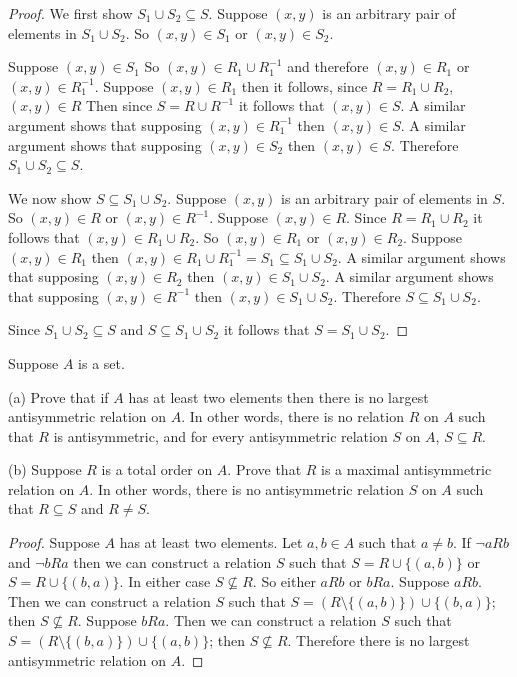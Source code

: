 \begin{proof}
    We first show $S_1 \cup S_2 \subseteq S$.
    Suppose $(x, y)$ is an arbitrary pair of elements in $S_1 \cup S_2$.
    So $(x, y) \in S_1$ or $(x, y) \in S_2$.

    Suppose $(x, y) \in S_1$
    So $(x, y) \in R_1 \cup R_1^{-1}$ and therefore $(x, y) \in R_1$ or $(x, y) \in R_1^{-1}$.
    Suppose $(x, y) \in R_1$ then it follows, since $R = R_1 \cup R_2$,
        $(x, y) \in R$
    Then since $S = R \cup R^{-1}$ it follows that $(x, y) \in S$.
    A similar argument shows that supposing $(x, y) \in R_1^{-1}$ then $(x, y) \in S$.
    A similar argument shows that supposing $(x, y) \in S_2$ then $(x, y) \in S$.
    Therefore $S_1 \cup S_2 \subseteq S$.

    We now show $S \subseteq S_1 \cup S_2$.
    Suppose $(x, y)$ is an arbitrary pair of elements in $S$.
    So $(x, y) \in R$ or $(x, y) \in R^{-1}$.
    Suppose $(x, y) \in R$.
    Since $R = R_1 \cup R_2$ it follows that
        $(x, y) \in R_1 \cup R_2$.
    So $(x, y) \in R_1$ or $(x, y) \in R_2$.
    Suppose $(x, y) \in R_1$ then $(x, y) \in R_1 \cup R_1^{-1} = S_1 \subseteq S_1 \cup S_2$.
    A similar argument shows that supposing $(x, y) \in R_2$
        then $(x, y) \in S_1 \cup S_2$.
    A similar argument shows that supposing $(x, y) \in R^{-1}$
        then $(x, y) \in S_1 \cup S_2$.
    Therefore $S \subseteq S_1 \cup S_2$.

    Since $S_1 \cup S_2 \subseteq S$ and $S \subseteq S_1 \cup S_2$ 
        it follows that $S = S_1 \cup S_2$.
\end{proof}

\begin{tcolorbox}[title=Problem 28, breakable]
    Suppose $A$ is a set.

    (a) Prove that if $A$ has at least two elements then there is no largest antisymmetric
        relation on $A$. In other words, there is no relation $R$ on $A$ such that 
        $R$ is antisymmetric, and for every antisymmetric relation $S$ on $A$, $S \subseteq R$.

    (b) Suppose $R$ is a total order on $A$. Prove that $R$ is a maximal antisymmetric relation 
        on $A$. In other words, there is no antisymmetric relation $S$ on $A$ such that $R \subseteq S$
        and $R \not= S$.
\end{tcolorbox}

\begin{proof}
    Suppose $A$ has at least two elements. Let $a, b \in A$
    such that $a \not = b$. If $\neg aRb$ and $\neg bRa$ then we 
    can construct a relation $S$ such that $S = R \cup \{(a, b)\}$ or $S = R \cup \{(b, a)\}$.
    In either case $S \not\subseteq R$. So either $aRb$ or $bRa$.
    Suppose $aRb$. Then we can construct a relation $S$ such that 
    $S = (R \setminus \{(a, b)\}) \cup \{(b, a)\}$;
        then $S \not\subseteq R$.
    Suppose $bRa$. Then we can construct a relation $S$ such that 
    $S = (R \setminus \{(b, a)\}) \cup \{(a, b)\}$;
        then $S \not\subseteq R$.
    Therefore there is no largest antisymmetric relation on $A$.
\end{proof}

